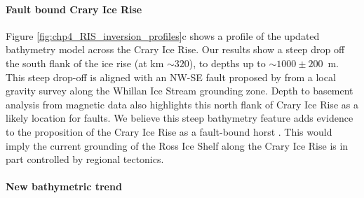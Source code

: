 

\paragraph*{Fault bound Crary Ice Rise}

Figure \ref{fig:chp4_RIS_inversion_profiles}c shows a profile of the updated bathymetry model across the Crary Ice Rise. Our results show a steep drop off the south flank of the ice rise (at km $\sim320$), to depths up to $\sim1000\pm200$~m. This steep drop-off is aligned with an NW-SE fault proposed by \citet{mutobathymetry2013} from a local gravity survey along the Whillan Ice Stream grounding zone. Depth to basement analysis from magnetic data \citep[Chapter \ref{ch:2},][]{tankersleybasement2022} also highlights this north flank of Crary Ice Rise as a likely location for faults. We believe this steep bathymetry feature adds evidence to the proposition of the Crary Ice Rise as a fault-bound horst \citep{mutobathymetry2013}. This would imply the current grounding of the Ross Ice Shelf along the Crary Ice Rise is in part controlled by regional tectonics. 

\paragraph*{New bathymetric trend}

